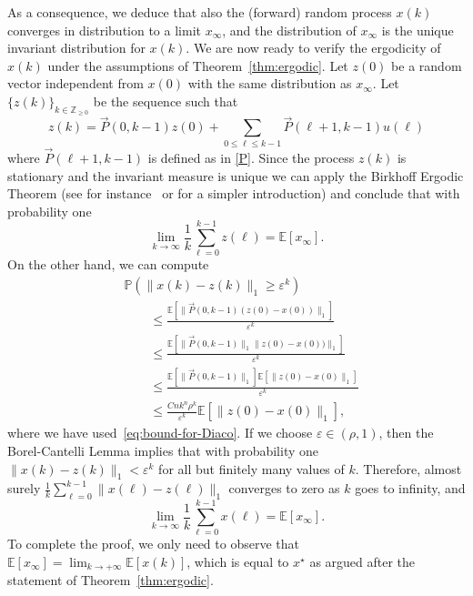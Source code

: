 \documentclass{IEEEtran}
\newcommand{\integernonnegative}{\mathbb{Z}_{\ge 0}}
\def\Exp{\mathbb{E}}
\newcommand{\1}{\mathbf{1}} \newcommand{\ind}{\mathds{1}}
\newcommand{\eps}{\varepsilon}
\begin{document}
As a consequence, we deduce that also the (forward) random process $x(k)$ converges in distribution to a limit $x_{\infty}$, and the distribution of $x_{\infty}$ is the unique invariant distribution for $x(k)$.
We are now ready to verify the ergodicity of $x(k)$ under the assumptions of Theorem~\ref{thm:ergodic}.
Let $z(0)$ be a random vector independent from $x(0)$ with the same distribution as $x_{\infty}$. Let $\{z(k)\}_{k\in \integernonnegative}$ be the sequence such that
$$
z(k)=\overrightarrow{P}(0,k-1)  z(0)+\sum_{0\leq \ell\leq k-1}\overrightarrow{P}(\ell+1,k-1)u(\ell)
$$
where $\overrightarrow{P}(\ell+1,k-1)$ is defined as in \eqref{P}.
Since the process $z (k)$ is stationary and the invariant measure is unique we can apply the Birkhoff Ergodic Theorem (see for instance~\cite[Chapter~6]{DS:1993} or \cite[Chapter~5]{MH:06} for a simpler introduction) and conclude that with probability one
$$\lim_{k\to\infty}\frac{1}{k}\sum_{\ell=0}^{k-1}z(\ell)=\Exp[x_\infty].$$
On the other hand, we can compute 
\begin{align}
&\mathbb{P}\left(\|x(k)-z(k)\|_1\geq \eps^k\right)\nonumber\\
&\qquad\leq\frac{\Exp\left[\|\overrightarrow{P}(0,k-1)  (z(0)-x(0))\|_1\right]}{\eps^k} \nonumber\\
&\qquad\leq \frac{\Exp\left[\|\overrightarrow{P}(0,k-1)\|_1\|z(0)-x(0))\|_1\right]}{\eps^k} \nonumber\\
& \qquad\leq \frac{\Exp\left[\|\overrightarrow{P}(0,k-1)\|_1\right]\Exp\left[\|z(0)-x(0)\|_1\right]}{\eps^k} \nonumber\\
& \qquad\leq \frac{Cnk^{n}\rho^{k}}{\eps^k} \Exp\left[\|z(0)-x(0)\|_1\right],\label{eq:conv_distr}
\end{align}
where we have used~\eqref{eq:bound-for-Diaco}.
If we choose $\eps\in(\rho,1)$, then the Borel-Cantelli Lemma \cite[Theorem~1.4.2]{VB:95} implies that with probability one $\|x(k)-z(k)\|_1<\eps^k$ for all but finitely many values
of $k$. Therefore, almost surely $\frac{1}{k}\sum_{\ell=0}^{k-1}\|x(\ell)-z(\ell)\|_1$ converges
 to zero as $k$ goes to infinity, and 
$$\lim_{k\to\infty}\frac{1}{k}\sum_{\ell=0}^{k-1}x(\ell)=\Exp[x_\infty].$$
To complete the proof, we only need to observe that $\Exp[x_\infty]=\lim_{k\to+\infty}\Exp[x(k)]$, which is equal to $x^\star$ as argued after the statement of Theorem~\ref{thm:ergodic}.
\end{document}
